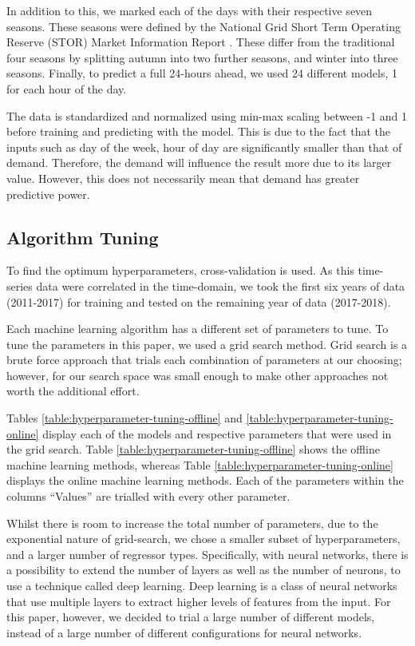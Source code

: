 \documentclass[final,3p,times,twocolumn,numbers]{elsarticle}
\begin{document}
In addition to this, we marked each of the days with their respective seven seasons. These seasons were defined by the National Grid Short Term Operating Reserve (STOR) Market Information Report \cite{ESO2019}. These differ from the traditional four seasons by splitting autumn into two further seasons, and winter into three seasons. Finally, to predict a full 24-hours ahead, we used 24 different models, 1 for each hour of the day. 


The data is standardized and normalized using min-max scaling between -1 and 1 before training and predicting with the model. This is due to the fact that the inputs such as day of the week, hour of day are significantly smaller than that of demand. Therefore, the demand will influence the result more due to its larger value. However, this does not necessarily mean that demand has greater predictive power.

\subsection{Algorithm Tuning}

To find the optimum hyperparameters, cross-validation is used. As this time-series data were correlated in the time-domain, we took the first six years of data (2011-2017) for training and tested on the remaining year of data (2017-2018).

Each machine learning algorithm has a different set of parameters to tune. To tune the parameters in this paper, we used a grid search method. Grid search is a brute force approach that trials each combination of parameters at our choosing; however, for our search space was small enough to make other approaches not worth the additional effort.

Tables \ref{table:hyperparameter-tuning-offline} and \ref{table:hyperparameter-tuning-online} display each of the models and respective parameters that were used in the grid search. Table \ref{table:hyperparameter-tuning-offline} shows the offline machine learning methods, whereas Table \ref{table:hyperparameter-tuning-online} displays the online machine learning methods. Each of the parameters within the columns ``Values'' are trialled with every other parameter.

Whilst there is room to increase the total number of parameters, due to the exponential nature of grid-search, we chose a smaller subset of hyperparameters, and a larger number of regressor types. Specifically, with neural networks, there is a possibility to extend the number of layers as well as the number of neurons, to use a technique called deep learning. Deep learning is a class of neural networks that use multiple layers to extract higher levels of features from the input. For this paper, however, we decided to trial a large number of different models, instead of a large number of different configurations for neural networks.
\end{document}
